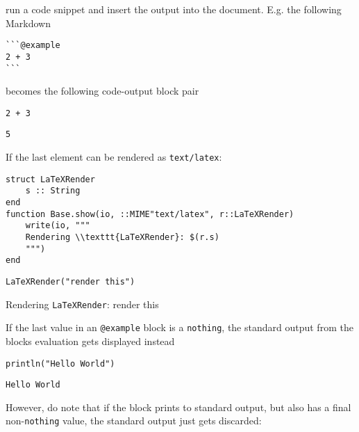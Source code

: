 \label{3545462789522369084}{}


 run a code snippet and insert the output into the document. E.g. the following Markdown




\begin{lstlisting}
```@example
2 + 3
```
\end{lstlisting}



becomes the following code-output block pair




\begin{verbatim}
2 + 3
\end{verbatim}


\begin{lstlisting}
5
\end{lstlisting}



If the last element can be rendered as \texttt{text/latex}:




\begin{verbatim}
struct LaTeXRender
    s :: String
end
function Base.show(io, ::MIME"text/latex", r::LaTeXRender)
    write(io, """
    Rendering \\texttt{LaTeXRender}: $(r.s)
    """)
end
\end{verbatim}




\begin{verbatim}
LaTeXRender("render this")
\end{verbatim}

Rendering \texttt{LaTeXRender}: render this


If the last value in an \texttt{@example} block is a \texttt{nothing}, the standard output from the blocks{\textquotesingle} evaluation gets displayed instead




\begin{verbatim}
println("Hello World")
\end{verbatim}


\begin{lstlisting}
Hello World
\end{lstlisting}



However, do note that if the block prints to standard output, but also has a final non-\texttt{nothing} value, the standard output just gets discarded:




